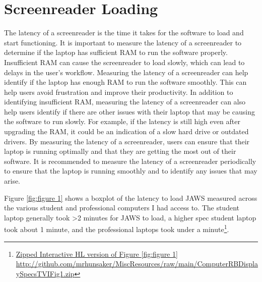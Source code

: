 \pagebreak \hypertarget{screenreader-loading}{}\section{Screenreader Loading}\label{screenreader-loading}
The latency of a screenreader is the time it takes for the software to load and start functioning. It is important to measure the latency of a screenreader to determine if the laptop has sufficient RAM to run the software properly. Insufficient RAM can cause the screenreader to load slowly, which can lead to delays in the user’s workflow. Measuring the latency of a screenreader can help identify if the laptop has enough RAM to run the software smoothly. This can help users avoid frustration and improve their productivity. In addition to identifying insufficient RAM, measuring the latency of a screenreader can also help users identify if there are other issues with their laptop that may be causing the software to run slowly. For example, if the latency is still high even after upgrading the RAM, it could be an indication of a slow hard drive or outdated drivers. By measuring the latency of a screenreader, users can ensure that their laptop is running optimally and that they are getting the most out of their software. It is recommended to measure the latency of a screenreader periodically to ensure that the laptop is running smoothly and to identify any issues that may arise.

Figure \ref{fig:figure 1} shows a boxplot of the latency to load JAWS measured across the various student and professional computers I had access to. The student laptop generally took \textgreater2 minutes for JAWS to load, a higher spec student laptop took about 1 minute, and the professional laptops took under a minute\footnote{\raggedright \href{http://github.com/mrhunsaker/MiscResources/raw/main/ComputerRBDisplaySpecsTVIFig1.zip}{Zipped Interactive HL version of Figure \ref{fig:figure 1}} \hfill\break\url{http://github.com/mrhunsaker/MiscResources/raw/main/ComputerRBDisplaySpecsTVIFig1.zip}}.

